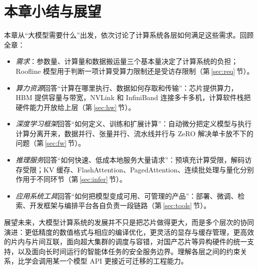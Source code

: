 \section{本章小结与展望}
\label{sec:summary}

本章从“大模型需要什么”出发，依次讨论了计算系统各层如何满足这些需求。回顾全章：
\begin{itemize}
  \item \emph{需求}：参数量、计算量和数据搬运量三个基本量决定了计算系统的负担；Roofline 模型用于判断一项计算受算力限制还是受访存限制（第\,\ref{sec:req}\,节）。
  \item \emph{算力资源}回答“计算在哪里执行、数据如何存取和传输”：芯片提供算力，HBM 提供容量与带宽，NVLink 和 InfiniBand 连接多卡多机，计算软件栈把硬件能力开放给上层（第\,\ref{sec:hw}\,节）。
  \item \emph{深度学习框架}回答“如何定义、训练和扩展计算”：自动微分把定义模型与执行计算分离开来，数据并行、张量并行、流水线并行与 ZeRO 解决单卡放不下的问题（第\,\ref{sec:fw}\,节）。
  \item \emph{推理服务}回答“如何快速、低成本地服务大量请求”：预填充计算受限，解码访存受限；KV 缓存、FlashAttention、PagedAttention、连续批处理与量化分别作用于不同环节（第\,\ref{sec:infer}\,节）。
  \item \emph{应用系统工具}回答“如何把模型变成可用、可管理的产品”：部署、微调、检索、开发框架与编排平台各自负责一段链路（第\,\ref{sec:tools}\,节）。
\end{itemize}

展望未来，大模型计算系统的发展并不只是把芯片做得更大，而是多个层次的协同演进：更低精度的数值格式与相应的编译优化，更灵活的显存与缓存管理，更高效的片内与片间互联，面向超大集群的调度与容错，对国产芯片等异构硬件的统一支持，以及面向长时间运行的智能体任务的安全服务边界。理解各层之间的约束关系，比学会调用某一个模型 API 更接近可迁移的工程能力。
